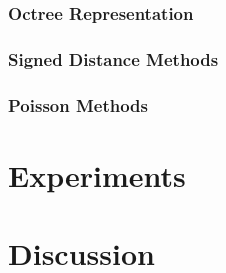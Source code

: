 \documentclass[10pt,twocolumn,letterpaper]{article}
\begin{document}

\subsubsection{Octree Representation}

\subsubsection{Signed Distance Methods}

\cite{surface_review, hoppe1992surface}

\subsubsection{Poisson Methods}

\cite{surface_review, poisson}

\section{Experiments}

\section{Discussion}

{\small
  
  
}
\end{document}
